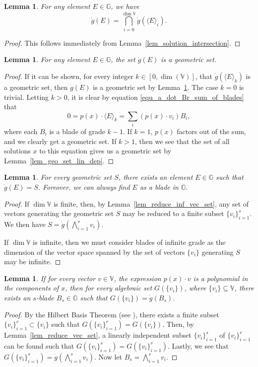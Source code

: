 \documentclass{birkjour}
\newtheorem{lem}[thm]{Lemma}
\theoremstyle{definition}
\theoremstyle{remark}
\numberwithin{equation}{section}
\newcommand{\G}{\mathbb{G}}
\newcommand{\V}{\mathbb{V}}
\newcommand{\gd}{\dot{g}}
\begin{document}
\begin{lem}\label{lem_intersect_grade_parts}
For any element $E\in\G$, we have
\begin{equation*}
\gd(E) = \bigcap_{i=0}^{\dim\V}\gd(\langle E\rangle_i).
\end{equation*}
\end{lem}
\begin{proof}
This follows immediately from Lemma~\ref{lem_solution_intersection}.
\end{proof}

\begin{lem}
For any element $E\in\G$, the set $\gd(E)$ is a geometric set.
\end{lem}
\begin{proof}
If it can be shown, for every integer $k\in[0,\dim(\V)]$, that $\gd(\langle E\rangle_k)$ is a geometric set,
then $\gd(E)$ is a geometric set by Lemma~\ref{lem_intersect_grade_parts}.
The case $k=0$ is trivial.  Letting $k>0$, it is clear by equation \eqref{equ_a_dot_Br_sum_of_blades} that
\begin{equation*}
0 = p(x)\cdot\langle E\rangle_k = \sum_i (p(x)\cdot v_i)B_i,
\end{equation*}
where each $B_i$ is a blade of grade $k-1$.  If $k=1$, $p(x)$ factors out of the sum, and we clearly get a geometric
set.  If $k>1$, then we see that the set of all solutions $x$
to this equation gives us a geometric set by Lemma~\ref{lem_geo_set_lin_dep}.
\end{proof}

\begin{lem}\label{lem_all_geo_sets_rep_by_blades}
For every geometric set $S$, there exists an element $E\in\G$ such that $\gd(E)=S$.
Foreover, we can always find $E$ as a blade in $\G$.
\end{lem}
\begin{proof}
If $\dim\V$ is finite, then, by Lemma~\ref{lem_reduce_inf_vec_set}, any set of vectors generating the geometric
set $S$ may be reduced to a finite subset $\{v_i\}_{i=1}^s$.
We then have $S=\gd(\bigwedge_{i=1}^s v_i)$.

If $\dim\V$ is infinite, then we must consider blades of infinite grade as the dimension
of the vector space spanned by the set of vectors $\{v_i\}$ generating $S$ may be infinite.
\end{proof}

\begin{lem}
If for every vector $v\in\V$, the expression $p(x)\cdot v$ is a polynomial in the components of $x$,
then for every algebraic set $G(\{v_i\})$, where $\{v_i\}\subseteq\V$, there exists an $s$-blade $B_s\in\G$ such that
$G(\{v_i\})=\gd(B_s)$.
\end{lem}
\begin{proof}
By the Hilbert Basis Theorem (see \cite[p. 204]{Garrity13}), there exists a finite subset $\{v_i\}_{i=1}^r\subset\{v_i\}$
such that $G(\{v_i\}_{i=1}^r)=G(\{v_i\})$.  Then, by Lemma~\ref{lem_reduce_vec_set}, a linearly independent subset $\{v_i\}_{i=1}^s$
of $\{v_i\}_{i=1}^r$ can be found such that $G(\{v_i\}_{i=1}^s)=G(\{v_i\}_{i=1}^r)$.
Lastly, we see that $G(\{v_i\}_{i=1}^s)=\gd(\bigwedge_{i=1}^s v_i)$.  Now let $B_s=\bigwedge_{i=1}^s v_i$.
\end{proof}
\end{document}
